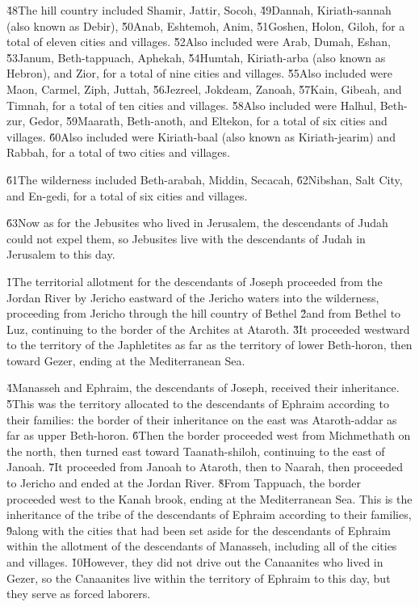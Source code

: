\v{48}The hill country included Shamir, Jattir, Socoh, \v{49}Dannah, Kiriath-sannah (also known as Debir), \v{50}Anab, Eshtemoh, Anim, \v{51}Goshen, Holon, Giloh, for a total of eleven cities and villages. \v{52}Also included were Arab, Dumah, Eshan, \v{53}Janum, Beth-tappuach, Aphekah, \v{54}Humtah, Kiriath-arba (also known as Hebron), and Zior, for a total of nine cities and villages. \v{55}Also included were Maon, Carmel, Ziph, Juttah, \v{56}Jezreel, Jokdeam, Zanoah, \v{57}Kain, Gibeah, and Timnah, for a total of ten cities and villages. \v{58}Also included were Halhul, Beth-zur, Gedor, \v{59}Maarath, Beth-anoth, and Eltekon, for a total of six cities and villages. \v{60}Also included were Kiriath-baal (also known as Kiriath-jearim) and Rabbah, for a total of two cities and villages.

\v{61}The wilderness included Beth-arabah, Middin, Secacah, \v{62}Nibshan, Salt City, and En-gedi, for a total of six cities and villages.

\v{63}Now as for the Jebusites who lived in Jerusalem, the descendants of Judah could not expel them, so Jebusites live with the descendants of Judah in Jerusalem to this day.

\v{1}The territorial allotment for the descendants of Joseph proceeded from the Jordan River by Jericho eastward of the Jericho waters into the wilderness, proceeding from Jericho through the hill country of Bethel \v{2}and from Bethel to Luz, continuing to the border of the Archites at Ataroth. \v{3}It proceeded westward to the territory of the Japhletites as far as the territory of lower Beth-horon, then toward Gezer, ending at the Mediterranean Sea.

\v{4}Manasseh and Ephraim, the descendants of Joseph, received their inheritance. \v{5}This was the territory allocated to the descendants of Ephraim according to their families: the border of their inheritance on the east was Ataroth-addar as far as upper Beth-horon. \v{6}Then the border proceeded west from Michmethath on the north, then turned east toward Taanath-shiloh, continuing to the east of Janoah. \v{7}It proceeded from Janoah to Ataroth, then to Naarah, then proceeded to Jericho and ended at the Jordan River. \v{8}From Tappuach, the border proceeded west to the Kanah brook, ending at the Mediterranean Sea. This is the inheritance of the tribe of the descendants of Ephraim according to their families, \v{9}along with the cities that had been set aside for the descendants of Ephraim within the allotment of the descendants of Manasseh, including all of the cities and villages. \v{10}However, they did not drive out the Canaanites who lived in Gezer, so the Canaanites live within the territory of Ephraim to this day, but they serve as forced laborers.

